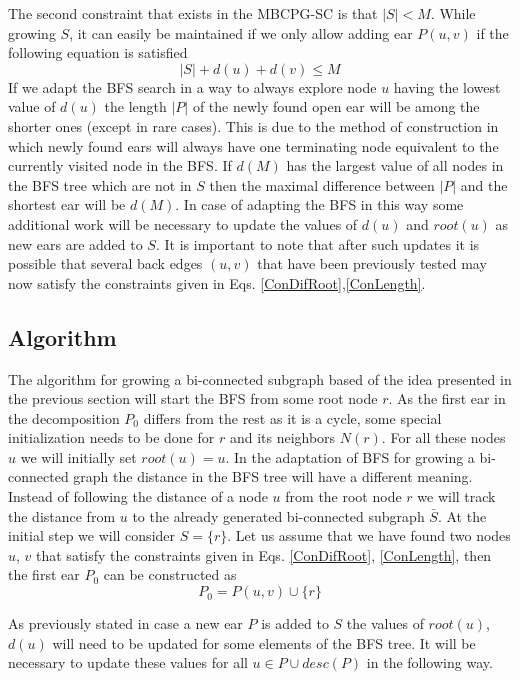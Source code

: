  The second constraint that exists in the MBCPG-SC is that $|S|<M$. While growing $S$, it can easily be maintained if we only allow adding  ear $P(u,v)$ if the following equation is satisfied 
\begin{equation}
\label{ConLength}
|S| + d(u)+ d(v) \leq M  
\end{equation}
If we adapt the BFS search in a way to always explore node $u$ having the lowest value of $d(u)$ the length $|P|$ of the newly found open ear will be among the shorter ones (except in rare cases).  This is due to the method of construction in which newly  found ears will always have one terminating node equivalent to the currently visited node in the BFS. If $d(M)$ has the largest value of all nodes in the BFS tree which are not in $S$ then the maximal   difference between $|P|$ and the shortest ear will be $d(M)$.  In case of adapting the BFS in this way some additional work will be necessary to update the values of $d(u)$ and $root(u) $ as new ears are added to $S$. It is important to note that after such updates it is possible that several back edges $(u,v)$ that have been previously tested may now satisfy the constraints given in Eqs. \eqref{ConDifRoot},\eqref{ConLength}.  

\subsection{Algorithm}

The algorithm for growing a bi-connected subgraph  based of the idea presented in the previous section will start the BFS from some root node $r$. As the first ear in the decomposition $P_0$ differs from the rest as it is a cycle, some special initialization needs to be done for $r$ and its neighbors $N(r)$. For all these nodes $u$ we will initially set $root(u)=u$. In the adaptation of BFS for growing a bi-connected graph the distance in the BFS tree will have a different meaning. Instead of following the distance of a node $u$ from the root node $r$ we will track the distance from $u$ to the already generated bi-connected subgraph $\bar{S}$. At the initial step we will consider $S = \{r\}$. Let us assume that we have found two nodes $u$, $v$ that satisfy the constraints given in Eqs. \eqref{ConDifRoot}, \eqref{ConLength}, then the first ear $P_0$  can be constructed as 
\begin{equation} 
\label{PRoot}
P_0 = P(u,v) \cup \{r \} 
\end{equation} 

As previously stated in case a new ear $P$ is added to   $S$ the values of $root(u)$, $d(u)$ will need to be updated for some elements of the BFS tree.  It will be necessary to update these values for all $u \in P \cup desc(P)$ in the following way.

